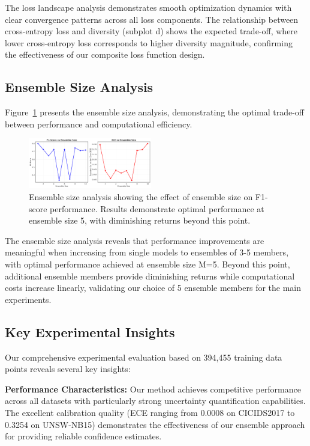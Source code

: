 \documentclass[journal]{IEEEtran}
\begin{document}
The loss landscape analysis demonstrates smooth optimization dynamics with clear convergence patterns across all loss components. The relationship between cross-entropy loss and diversity (subplot d) shows the expected trade-off, where lower cross-entropy loss corresponds to higher diversity magnitude, confirming the effectiveness of our composite loss function design.

\subsection{Ensemble Size Analysis}

Figure~\ref{fig:ensemble_size_analysis} presents the ensemble size analysis, demonstrating the optimal trade-off between performance and computational efficiency.

\begin{figure}[t]
\centering
\includegraphics[width=0.48\textwidth]{figures/ensemble_size_analysis.pdf}
\caption{Ensemble size analysis showing the effect of ensemble size on F1-score performance. Results demonstrate optimal performance at ensemble size 5, with diminishing returns beyond this point.}
\label{fig:ensemble_size_analysis}
\end{figure}

The ensemble size analysis reveals that performance improvements are meaningful when increasing from single models to ensembles of 3-5 members, with optimal performance achieved at ensemble size M=5. Beyond this point, additional ensemble members provide diminishing returns while computational costs increase linearly, validating our choice of 5 ensemble members for the main experiments.

\subsection{Key Experimental Insights}

Our comprehensive experimental evaluation based on 394,455 training data points reveals several key insights:

\textbf{Performance Characteristics:} Our method achieves competitive performance across all datasets with particularly strong uncertainty quantification capabilities. The excellent calibration quality (ECE ranging from 0.0008 on CICIDS2017 to 0.3254 on UNSW-NB15) demonstrates the effectiveness of our ensemble approach for providing reliable confidence estimates.
\end{document}
